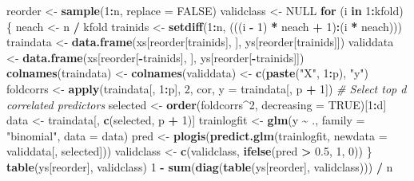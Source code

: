 \documentclass[
]{article}
\newenvironment{Shaded}{\begin{snugshade}}{\end{snugshade}}
\newcommand{\AttributeTok}[1]{\textcolor[rgb]{0.13,0.29,0.53}{#1}}
\newcommand{\CommentTok}[1]{\textcolor[rgb]{0.56,0.35,0.01}{\textit{#1}}}
\newcommand{\ConstantTok}[1]{\textcolor[rgb]{0.56,0.35,0.01}{#1}}
\newcommand{\ControlFlowTok}[1]{\textcolor[rgb]{0.13,0.29,0.53}{\textbf{#1}}}
\newcommand{\DecValTok}[1]{\textcolor[rgb]{0.00,0.00,0.81}{#1}}
\newcommand{\FloatTok}[1]{\textcolor[rgb]{0.00,0.00,0.81}{#1}}
\newcommand{\FunctionTok}[1]{\textcolor[rgb]{0.13,0.29,0.53}{\textbf{#1}}}
\newcommand{\NormalTok}[1]{#1}
\newcommand{\OtherTok}[1]{\textcolor[rgb]{0.56,0.35,0.01}{#1}}
\newcommand{\SpecialCharTok}[1]{\textcolor[rgb]{0.81,0.36,0.00}{\textbf{#1}}}
\newcommand{\StringTok}[1]{\textcolor[rgb]{0.31,0.60,0.02}{#1}}
\begin{document}
\begin{Shaded}
\begin{Highlighting}[]
\NormalTok{reorder }\OtherTok{\textless{}{-}} \FunctionTok{sample}\NormalTok{(}\DecValTok{1}\SpecialCharTok{:}\NormalTok{n, }\AttributeTok{replace =} \ConstantTok{FALSE}\NormalTok{)}
\NormalTok{validclass }\OtherTok{\textless{}{-}} \ConstantTok{NULL}
\ControlFlowTok{for}\NormalTok{ (i }\ControlFlowTok{in} \DecValTok{1}\SpecialCharTok{:}\NormalTok{kfold) \{}
\NormalTok{  neach }\OtherTok{\textless{}{-}}\NormalTok{ n }\SpecialCharTok{/}\NormalTok{ kfold}
\NormalTok{  trainids }\OtherTok{\textless{}{-}} \FunctionTok{setdiff}\NormalTok{(}\DecValTok{1}\SpecialCharTok{:}\NormalTok{n, (((i }\SpecialCharTok{{-}} \DecValTok{1}\NormalTok{) }\SpecialCharTok{*}\NormalTok{ neach }\SpecialCharTok{+} \DecValTok{1}\NormalTok{)}\SpecialCharTok{:}\NormalTok{(i }\SpecialCharTok{*}\NormalTok{ neach)))}
\NormalTok{  traindata }\OtherTok{\textless{}{-}} \FunctionTok{data.frame}\NormalTok{(xs[reorder[trainids], ], ys[reorder[trainids]])}
\NormalTok{  validdata }\OtherTok{\textless{}{-}} \FunctionTok{data.frame}\NormalTok{(xs[reorder[}\SpecialCharTok{{-}}\NormalTok{trainids], ], ys[reorder[}\SpecialCharTok{{-}}\NormalTok{trainids]])}
  \FunctionTok{colnames}\NormalTok{(traindata) }\OtherTok{\textless{}{-}} \FunctionTok{colnames}\NormalTok{(validdata) }\OtherTok{\textless{}{-}} \FunctionTok{c}\NormalTok{(}\FunctionTok{paste}\NormalTok{(}\StringTok{"X"}\NormalTok{, }\DecValTok{1}\SpecialCharTok{:}\NormalTok{p), }\StringTok{"y"}\NormalTok{)}
\NormalTok{  foldcorrs }\OtherTok{\textless{}{-}} \FunctionTok{apply}\NormalTok{(traindata[, }\DecValTok{1}\SpecialCharTok{:}\NormalTok{p], }\DecValTok{2}\NormalTok{, cor, }\AttributeTok{y =}\NormalTok{ traindata[, p }\SpecialCharTok{+} \DecValTok{1}\NormalTok{])}
  \CommentTok{\# Select top d correlated predictors}
\NormalTok{  selected }\OtherTok{\textless{}{-}} \FunctionTok{order}\NormalTok{(foldcorrs}\SpecialCharTok{\^{}}\DecValTok{2}\NormalTok{, }\AttributeTok{decreasing =} \ConstantTok{TRUE}\NormalTok{)[}\DecValTok{1}\SpecialCharTok{:}\NormalTok{d] }
\NormalTok{  data }\OtherTok{\textless{}{-}}\NormalTok{ traindata[, }\FunctionTok{c}\NormalTok{(selected, p }\SpecialCharTok{+} \DecValTok{1}\NormalTok{)]}
\NormalTok{  trainlogfit }\OtherTok{\textless{}{-}} \FunctionTok{glm}\NormalTok{(y }\SpecialCharTok{\textasciitilde{}}\NormalTok{ ., }\AttributeTok{family =} \StringTok{"binomial"}\NormalTok{, }\AttributeTok{data =}\NormalTok{ data)}
\NormalTok{  pred }\OtherTok{\textless{}{-}} \FunctionTok{plogis}\NormalTok{(}\FunctionTok{predict.glm}\NormalTok{(trainlogfit, }\AttributeTok{newdata =}\NormalTok{ validdata[, selected]))}
\NormalTok{  validclass }\OtherTok{\textless{}{-}} \FunctionTok{c}\NormalTok{(validclass, }\FunctionTok{ifelse}\NormalTok{(pred }\SpecialCharTok{\textgreater{}} \FloatTok{0.5}\NormalTok{, }\DecValTok{1}\NormalTok{, }\DecValTok{0}\NormalTok{))}
\NormalTok{\}}
\FunctionTok{table}\NormalTok{(ys[reorder], validclass)}
\DecValTok{1} \SpecialCharTok{{-}} \FunctionTok{sum}\NormalTok{(}\FunctionTok{diag}\NormalTok{(}\FunctionTok{table}\NormalTok{(ys[reorder], validclass))) }\SpecialCharTok{/}\NormalTok{ n}
\end{Highlighting}
\end{Shaded}
\end{document}
